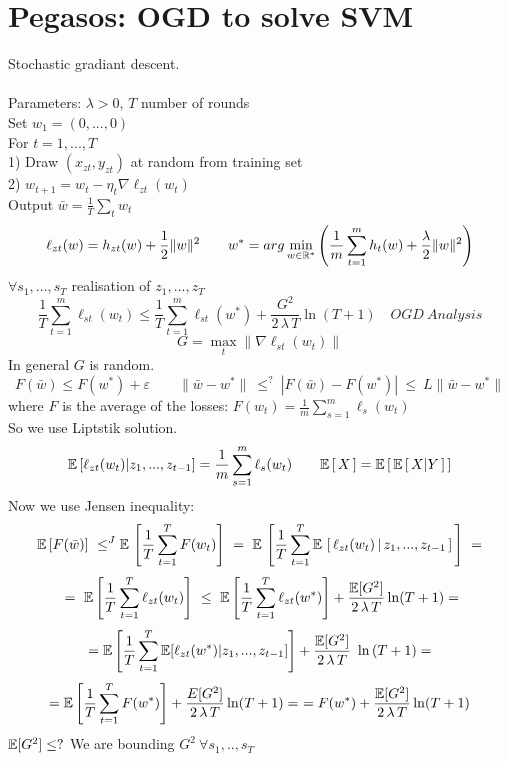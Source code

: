 \documentclass[../main.tex]{subfiles}
\begin{document}
\section{Pegasos: OGD to solve SVM}
Stochastic gradiant descent.
\\\\
Parameters: $ \lambda > 0$, $T$ number of rounds
\\
Set $w_1 =(0,...,0)$
\\
For $t = 1,...,T$
\\
1) Draw $(x_{zt}, y_{zt})$ at random from training set
\\
2) $w_{t+1} = w_t - \eta_t \nabla \ell_{zt}(w_t)$
\\
Output $\bar{w} = \frac{1}{T} \sum_t w_t$
$$
\ell_{zt}(w) = h_{zt} (w) + \frac{1}{2} \| w\|^2 \qquad w^* = arg \min_{w \in \mathbb{R}^*} \left( \frac{1}{m} \sum_{t=1}^m h_t(w) + \frac{\lambda}{2} \| w\|^2\right)
$$
$\forall s_1,...,s_T$ realisation of $z_1,...,z_T$
$$
\frac{1}{T} \sum_{t=1}^m \ell_{st}(w_t) \leq \frac{1}{T}\sum_{t=1}^m \ell_{st} (w^*) + \frac{G^2}{2 \, \lambda \, T} \ln (T+1) \quad OGD\ Analysis
$$
$$
G = \max_t \| \nabla \ell_{st}(w_t) \|
$$
In general $G$ is random.
$$
F(\bar{w}) \leq F(w^*) + \varepsilon \qquad \| \bar{w}- w^*\| \ \leq^? \ | F(\bar{w}) - F(w^*) |  \ \leq \ L \| \bar{w} - w^* \|
$$
where $F$ is the average of the losses: $F(w_t) = \frac{1}{m} \sum_{s=1}^m \ell_s(w_t)$ \\
So we use Liptstik solution.
$$
\mathbb{E} \, [\ell_{zt}(w_t) | z_1,...,z_{t-1}] = \frac{1}{m} \sum_{s=1}^m \ell_s(w_t) \qquad \mathbb{E} \left[ \, X \, \right] = \mathbb{E} \left[ \, \mathbb{E} \left[ \, X | Y \, \right] \, \right]
$$
Now we use Jensen inequality:
$$
\mathbb{E} \, [ F(\bar{w} ) ] \ \leq^{J} \mathbb{E} \, \left[ \frac{1}{T} \sum_{t=1}^T F(w_t) \right] \ = \ \mathbb{E} \, \left[ \frac{1}{T} \sum_{t=1}^T \mathbb{E} \, \left[ \, \ell_{zt}(w_t) \, | \, z_1,...,z_{t-1} \, \right] \, \right]
\ = $$
$$
\ = \ \mathbb{E} \left[ \frac{1}{T} \sum^T_{t=1} \ell_{zt} (w_t) \right] \ \leq \ \mathbb{E} \left[ \frac{1}{T} \sum_{t=1}^T \ell_{zt}(w^*) \right] + \frac{\mathbb{E}[G^2]}{2 \, \lambda \, T} \ln (T+1) = 
$$ 
$$
=  \mathbb{E} \left[ \frac{1}{T} \sum_{t=1}^T \mathbb{E} [\ell_{zt}(w^*) | z_1,...,z_{t-1} ]\right] + \frac{\mathbb{E} [G^2]}{2 \, \lambda \, T} \ \ln \, (T+1) = 
$$
$$
= \mathbb{E} \left[ \frac{1}{T} \sum_{t=1}^T F(w^*) \right] + \frac{E[G^2]}{2 \, \lambda \, T} \ln (T+1) = \ = F(w^*) + \frac{\mathbb{E} [G^2]}{2 \, \lambda \, T} \ln (T+1)
$$
$\mathbb{E} [G^2] \leq ?
$
We are bounding $G^2 \ \forall s_1,..,s_T$
\end{document}

